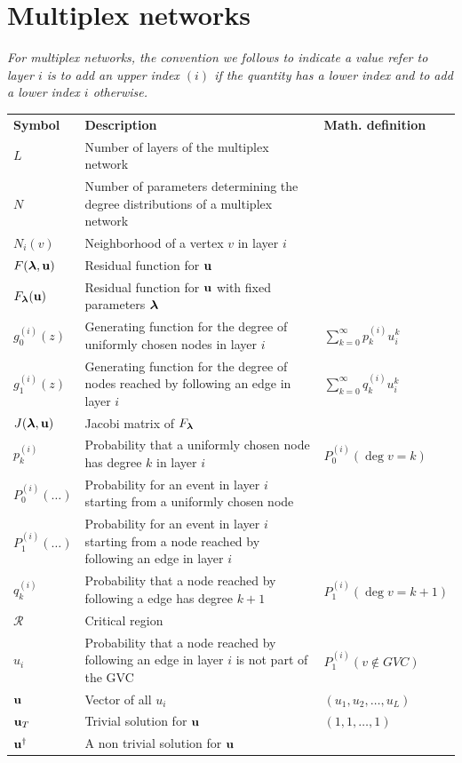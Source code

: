 \documentclass[
11pt, %
english, %
singlespacing, %
nolistspacing, %
liststotoc, %
headsepline, %
]{MastersDoctoralThesis} %
\begin{document}
\newpage

\section*{Multiplex networks}

\emph{For multiplex networks, the convention we follows to indicate a value refer to layer $i$ is to add an upper index $(i)$ if the quantity has a lower index and to add a lower index $i$ otherwise.}

\begin{longtable}{m{}m{}m{}}

\textbf{Symbol}	& \textbf{Description} & \textbf{Math. definition} \\
\addlinespace

$L$ 				& Number of layers of the multiplex network \\
$N$					& Number of parameters determining the degree distributions of a multiplex network \\
$N_i(v)$ 			& Neighborhood of a vertex $v$ in layer $i$ \\
$F(\boldsymbol{\mathrm{\lambda}}, \boldsymbol{\mathrm{u}})$ & Residual function for $\boldsymbol{\mathrm{u}}$ \\
$F_{\boldsymbol{\mathrm{\lambda}}}(\boldsymbol{\mathrm{u}})$		&Residual function for $\boldsymbol{\mathrm{u}}$ with fixed parameters $\boldsymbol{\mathrm{\lambda}}$ \\
$g^{(i)}_0(z)$		& Generating function for the degree of uniformly chosen nodes in layer $i$ & $\sum_{k=0}^\infty p^{(i)}_k u_i^k$ \\
$g^{(i)}_1(z)$		& Generating function for the degree of nodes reached by following an edge in layer $i$ & $\sum_{k=0}^\infty q^{(i)}_k u_i^k$ \\
$J(\boldsymbol{\mathrm{\lambda}}, \boldsymbol{\mathrm{u}})$					& Jacobi matrix of $F_{\boldsymbol{\mathrm{\lambda}}}$ \\
$p^{(i)}_k$			& Probability that a uniformly chosen node has degree $k$ in layer $i$ & $P^{(i)}_0(\deg{v} = k)$ \\
$P^{(i)}_0(\dots)$	& Probability for an event in layer $i$ starting from a uniformly chosen node  \\
$P^{(i)}_1(\dots)$	& Probability for an event in layer $i$ starting from a node reached by following an edge in layer $i$ \\
$q^{(i)}_k$		& Probability that a node reached by following a edge has degree $k + 1$ & $P^{(i)}_1(\deg{v} = k + 1)$ \\
$\mathcal{R}$	& Critical region \\
$u_i$			& Probability that a node reached by following an edge in layer $i$ is not part of the GVC & $P^{(i)}_1(v \notin GVC)$ \\
$\boldsymbol{\mathrm{u}}$			& Vector of all $u_i$ & $(u_1, u_2, \dots, u_L)$ \\
$\boldsymbol{\mathrm{u}}_T$		& Trivial solution for $\boldsymbol{\mathrm{u}}$ & $(1, 1, \dots, 1)$ \\
$\boldsymbol{\mathrm{u}}^\dagger$	& A non trivial solution for $\boldsymbol{\mathrm{u}}$ \\


\end{longtable}
\end{document}
